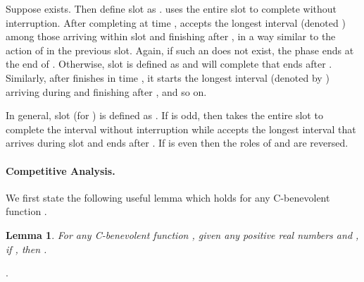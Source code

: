 \documentclass[11pt]{article}
\newtheorem{lemma}{Lemma}[section]
\newcommand{\qed}{\hspace*{\fill}\par\medskip}
\newenvironment{proof}{\noindent{\it Proof. }\ignorespaces}{\qed}
\begin{document}
Suppose  exists.
Then define slot  as .
 uses the entire slot  to complete  without interruption.
After completing  at time , 
 accepts the longest interval (denoted )
among those arriving within slot  and finishing after ,
in a way similar to the action of  in the previous slot.
Again, if such an  does not exist, 
the phase ends at the end of .
Otherwise, slot  is defined as 
and  will complete  that ends after .
Similarly, after  finishes  in time ,
it starts the longest interval (denoted by )
arriving during  and finishing after , and so on.

In general, slot  (for ) is defined as .
If  is odd, then  takes the entire slot to complete the interval
 without interruption while  accepts the longest interval 
 that arrives during slot  and ends after .  
If  is even then the roles of  and  are reversed.

\paragraph{Competitive Analysis.}

We first state the
following useful lemma which holds for any C-benevolent function .

\begin{lemma} \label{l1}
For any C-benevolent function , given any  positive
real numbers   and , if , then .
\end{lemma}
\begin{proof}
.  
\end{proof}
\end{document}
